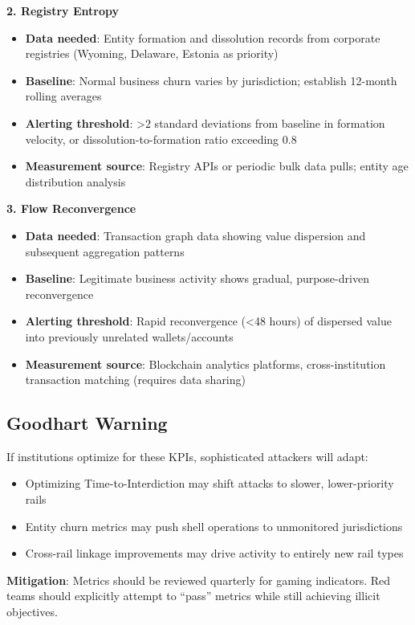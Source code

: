 \documentclass[11pt,letterpaper]{article}
\begin{document}
\textbf{2. Registry Entropy}
\begin{itemize}
  \item \textbf{Data needed}: Entity formation and dissolution records from corporate registries (Wyoming, Delaware, Estonia as priority)
  \item \textbf{Baseline}: Normal business churn varies by jurisdiction; establish 12-month rolling averages
  \item \textbf{Alerting threshold}: >2 standard deviations from baseline in formation velocity, or dissolution-to-formation ratio exceeding 0.8
  \item \textbf{Measurement source}: Registry APIs or periodic bulk data pulls; entity age distribution analysis
\end{itemize}

\textbf{3. Flow Reconvergence}
\begin{itemize}
  \item \textbf{Data needed}: Transaction graph data showing value dispersion and subsequent aggregation patterns
  \item \textbf{Baseline}: Legitimate business activity shows gradual, purpose-driven reconvergence
  \item \textbf{Alerting threshold}: Rapid reconvergence (<48 hours) of dispersed value into previously unrelated wallets/accounts
  \item \textbf{Measurement source}: Blockchain analytics platforms, cross-institution transaction matching (requires data sharing)
\end{itemize}

\subsection{Goodhart Warning}

\begin{warnbox}
If institutions optimize for these KPIs, sophisticated attackers will adapt:
\begin{itemize}
  \item Optimizing Time-to-Interdiction may shift attacks to slower, lower-priority rails
  \item Entity churn metrics may push shell operations to unmonitored jurisdictions
  \item Cross-rail linkage improvements may drive activity to entirely new rail types
\end{itemize}

\textbf{Mitigation}: Metrics should be reviewed quarterly for gaming indicators. Red teams should explicitly attempt to ``pass'' metrics while still achieving illicit objectives.
\end{warnbox}
\end{document}
